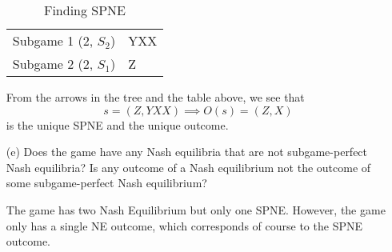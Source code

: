\documentclass[11pt]{article}
\begin{document}
\begin{enumerate}
\begin{solution}
\begin{table}[H]
\begin{tabular}{cl}
             Subgame 1 (2, $S_2$)&  YXX\\
             Subgame 2 (2, $S_1$)& Z
             \\\end{tabular}
        \caption{Finding SPNE}
    \end{table}
    From the arrows in the tree and the table above, we see that \[\boxed{s = (Z, YXX) \implies O(s) = (Z,X)}\] is the unique SPNE and the unique outcome.
\end{solution}
    \item[(e)] Does the game have any Nash equilibria that are not subgame-perfect Nash equilibria? Is any outcome of a Nash equilibrium not the outcome of some subgame-perfect Nash equilibrium?
    \begin{solution}
        The game has two Nash Equilibrium but only one SPNE. However, the game only has a single NE outcome, which corresponds of course to the SPNE outcome.
    \end{solution}
\end{enumerate}
\end{document}
